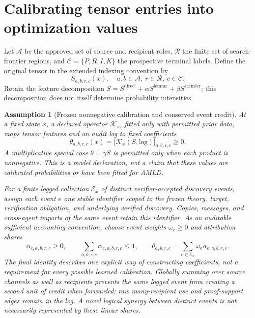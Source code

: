 \documentclass[11pt]{article}
\newtheorem{assumption}[definition]{Assumption}
\newcommand{\Aset}{\mathcal A}
\newcommand{\Cset}{\mathcal C}
\newcommand{\Rset}{\mathcal R}
\begin{document}
\section{Calibrating tensor entries into optimization values}\label{sec:attribution}
Let $\Aset$ be the approved set of source and recipient roles, $\Rset$ the finite set of search-frontier regions, and $\Cset=\{P,R,I,K\}$ the prospective terminal labels. Define the original tensor in the extended indexing convention by
\[
S_{a,b,r,c}(x),\quad a,b\in\Aset,\ r\in\Rset,\ c\in\Cset.
\]
Retain the feature decomposition $S=S^{\mathrm{direct}}+\alpha S^{\mathrm{lemma}}+\beta S^{\mathrm{transfer}}$; this decomposition does not itself determine probability intensities.

\begin{assumption}[Frozen nonnegative calibration and conserved event credit]\label{ass:calibration}
At a fixed state $x$, a declared operator $\mathcal K_x$, fitted only with permitted prior data, maps tensor features and an audit log to fixed coefficients
\[
\theta_{a,b,r,c}(x)=\bigl[\mathcal K_x(S,\mathrm{log})\bigr]_{a,b,r,c}\ge0.
\]
A multiplicative special case $\theta=\gamma S$ is permitted only when each product is nonnegative. This is a \emph{model declaration}, not a claim that these values are calibrated probabilities or have been fitted for AMLD.

For a finite logged collection $\mathcal E_x$ of distinct verifier-accepted discovery events, assign each event $e$ one stable identifier scoped to the frozen theory, target, verification obligation, and underlying verified discovery. Copies, messages, and cross-agent imports of the same event retain this identifier. As an \emph{auditable sufficient accounting convention}, choose event weights $\omega_e\ge0$ and attribution shares
\begin{equation}\label{eq:event-credit}
\alpha_{e,a,b,r,c}\ge0,\qquad
\sum_{a,b,r,c}\alpha_{e,a,b,r,c}\le1,\qquad
\theta_{a,b,r,c}=\sum_{e\in\mathcal E_x}\omega_e\alpha_{e,a,b,r,c}.
\end{equation}
The final identity describes one explicit way of constructing coefficients, not a requirement for every possible learned calibration. Globally summing over source channels as well as recipients prevents the same logged event from creating a second unit of credit when forwarded; raw many-recipient use and proof-support edges remain in the log. A novel logical synergy between distinct events is not necessarily represented by these linear shares.
\end{assumption}
\end{document}

